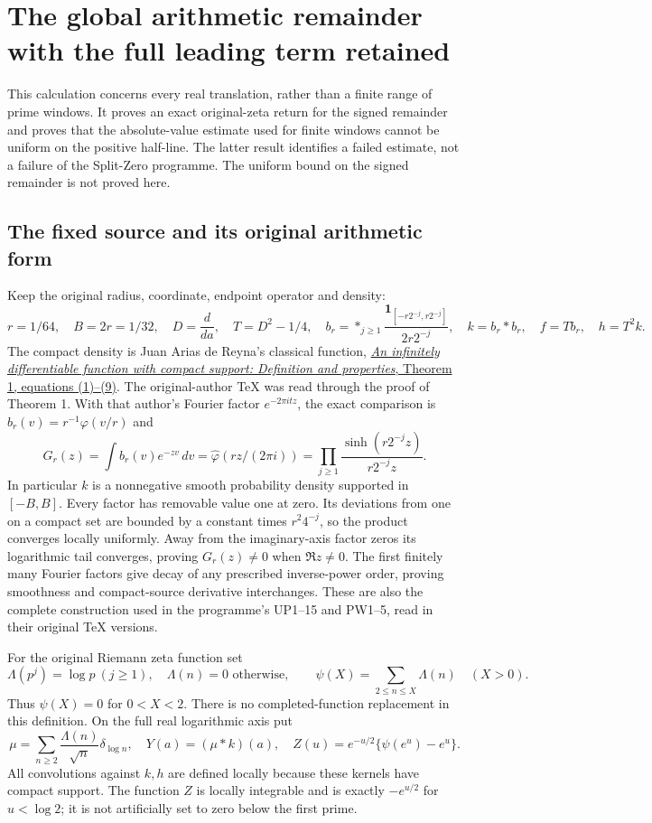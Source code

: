 \section{The global arithmetic remainder with the full leading term retained}

This calculation concerns every real translation, rather than a finite
range of prime windows. It proves an exact original-zeta return for the
signed remainder and proves that the absolute-value estimate used for
finite windows cannot be uniform on the positive half-line. The latter
result identifies a failed estimate, not a failure of the Split-Zero
programme. The uniform bound on the signed remainder is not proved here.

\subsection{The fixed source and its original arithmetic form}

Keep the original radius, coordinate, endpoint operator and density:
\[
 r=1/64,\quad B=2r=1/32,\quad D=\frac{d}{da},\quad
 T=D^2-1/4,\quad
 b_r=\mathop{*}_{j\ge1}\frac{\mathbf1_{[-r2^{-j},r2^{-j}]}}{2r2^{-j}},
 \quad k=b_r*b_r,\quad f=Tb_r,\quad h=T^2k.
 \tag{GC1}
\]
The compact density is Juan Arias de Reyna's classical function,
\href{https://arxiv.org/abs/1702.05442v1}{\emph{An infinitely differentiable
function with compact support: Definition and properties}, Theorem 1,
equations (1)--(9)}. The original-author TeX was read through the proof
of Theorem 1. With that author's Fourier factor \(e^{-2\pi itz}\),
the exact comparison is \(b_r(v)=r^{-1}\varphi(v/r)\) and
\[
 G_r(z)=\int b_r(v)e^{-zv}\,dv
       =\widehat\varphi(rz/(2\pi i))
       =\prod_{j\ge1}\frac{\sinh(r2^{-j}z)}{r2^{-j}z}.
 \tag{GC2}
\]
In particular \(k\) is a nonnegative smooth probability density
supported in \([-B,B]\). Every factor has removable value one at zero.
Its deviations from one on a compact set are bounded by a constant
times \(r^2 4^{-j}\), so the product converges locally uniformly.
Away from the imaginary-axis factor zeros its logarithmic tail
converges, proving \(G_r(z)\ne0\) when \(\Re z\ne0\).
The first finitely many Fourier factors give decay of any prescribed
inverse-power order, proving smoothness and compact-source derivative
interchanges. These are also the complete construction used in the
programme's UP1--15 and PW1--5, read in their original TeX versions.

For the original Riemann zeta function set
\[
 \Lambda(p^j)=\log p\ (j\ge1),\quad\Lambda(n)=0\text{ otherwise},\qquad
 \psi(X)=\sum_{2\le n\le X}\Lambda(n)\quad(X>0).
 \tag{GC3}
\]
Thus \(\psi(X)=0\) for \(0<X<2\). There is no completed-function
replacement in this definition. On the full real logarithmic axis put
\[
 \mu=\sum_{n\ge2}\frac{\Lambda(n)}{\sqrt n}\delta_{\log n},\quad
 Y(a)=(\mu*k)(a),\quad
 Z(u)=e^{-u/2}\{\psi(e^u)-e^u\}.
 \tag{GC4}
\]
All convolutions against \(k,h\) are defined locally because these
kernels have compact support. The function \(Z\) is locally integrable
and is exactly \(-e^{u/2}\) for \(u<\log2\); it is not artificially
set to zero below the first prime.

